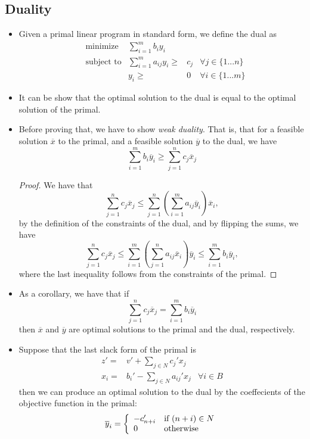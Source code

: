 \subsection{Duality}
\begin{itemize}
\item Given a primal linear program in standard form, we define the
  dual as
  \begin{align*}
    & \text{minimize} & \sum_{i=1}^m b_i y_i \\
    & \text{subject to} & \sum_{i=1}^m a_{ij} y_i \geq{}& c_j & \forall j \in \{1...n\} \\
    &                   & y_i \geq{}& 0 & \forall i \in \{ 1...m \}
  \end{align*}

\item It can be show that the optimal solution to the dual is equal to
  the optimal solution of the primal.

\item Before proving that, we have to show \emph{weak duality}. That
  is, that for a feasible solution $\overline{x}$ to the primal, and a
  feasible solution $\overline{y}$ to the dual, we have
$$
  \sum_{i=1}^m b_i \overline{y}_i \geq \sum_{j=1}^n c_j \overline{x}_j
$$
\begin{proof}
  We have that
  $$
  \sum_{j=1}^n c_j \overline{x}_j \leq \sum_{j=1}^n \left(\sum_{i=1}^m a_{ij}\overline{y}_i \right) \overline{x}_i,
  $$
  by the definition of the constraints of the dual, and by flipping the sums, we have
  $$
  \sum_{j=1}^n c_j \overline{x}_j \leq \sum_{i=1}^m \left(\sum_{j=1}^n a_{ij}\overline{x}_i \right) \overline{y}_i \leq \sum_{i=1}^m b_i \overline{y}_i,
  $$
  where the last inequality follows from the constraints of the primal.
\end{proof}

\item As a corollary, we have that if
$$
  \sum_{j=1}^n c_j \overline{x}_j = \sum_{i=1}^m b_i \overline{y}_i
$$
then $\overline{x}$ and $\overline{y}$ are optimal solutions to the
primal and the dual, respectively.

\item Suppose that the last slack form of the primal is
\begin{align*}
  z' ={}& v' + \sum_{j\in N} c_j' x_j \\
  x_i ={}& b_i' - \sum_{j \in N} a_{ij}' x_j & \forall i \in B
\end{align*}
then we can produce an optimal solution to the dual by the
coeffecients of the objective function in the primal:
$$
  \overline{y}_i = \left\{
    \begin{array}{l l}
      -c_{n+i}' & \text{if $(n+i) \in N$} \\
      0 & \text{otherwise}
    \end{array} \right.
$$


\end{itemize}
